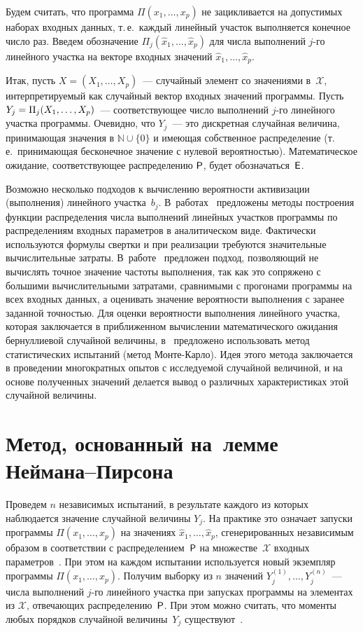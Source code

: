\begin{multicols}{2}
Будем считать, что программа $\Pi(x_1,\ldots,x_p)$ не зацикливается
на допустимых наборах входных данных, т.\,е.\ каждый линейный
участок выполняется конечное число раз. Введем обозначение
$\Pi_j(\hat x_1,\ldots,\hat x_p)$ для числа выполнений $j$-го
линейного участка на векторе входных значений $\hat x_1,\ldots,\hat
x_p$.

Итак, пусть $X=(X_1,\ldots,X_p)$~--- случайный элемент со значениями
в~$\mathcal{X}$, интерпретируемый как случайный вектор входных
значений программы. Пусть $Y_j\hm=\Pi_j(X_1,\ldots,X_p)$~---
соответствующее чис\-ло выполнений $j$-го линейного участка программы.
Очевидно, что $Y_j$~--- это дискретная случайная величина,
принимающая значения в $\mathbb{N}\cup\{0\}$ и имеющая собственное
распределение (т.\,е.\ принимающая бесконечное значение с нулевой
ве\-ро\-ят\-ностью). Математическое ожидание, соответствующее
распределению ${\sf P}$, будет обозначаться~${\sf E}$.

Возможно несколько подходов к вычислению вероятности активизации
(выполнения) линейного участка~$b_j$. В~работах~\cite{SmelyanskiAlanko1986, SmelyanskiGuryevBahmurov1986} предложены
методы построения функции распределения числа выполнений линейных
участков программы по распределениям входных параметров в
аналитическом виде. Фактически используются формулы свертки и при
реализации требуются значительные вычислительные затраты. 
В~работе~\cite{Shalimov2010} предложен подход, позволяющий не вычислять
точное значение частоты выполнения, так как это сопряжено с большими
вычислительными затратами, сравнимыми с прогонами программы на всех
входных данных, а оценивать значение вероятности выполнения с
заранее заданной точностью. Для оценки вероятности выполнения
линейного участка, которая заключается в приближенном вычислении
математического ожидания бернуллиевой случайной величины, 
в~\cite{Shalimov2010} предложено использовать метод статистических
испытаний (метод Мон\-те-Кар\-ло). Идея этого метода заключается в
проведении многократных опытов с исследуемой случайной величиной,   и
на основе полученных значений делается вывод о различных
характеристиках этой случайной величины.

\section{Метод, основанный на~лемме Неймана--Пирсона}

Проведем $n$ независимых испытаний, в результате каждого из которых
наблюдается значение случайной величины $Y_j$. На практике это
означает запуски программы $\Pi(x_1,\ldots,x_p)$ на значениях $\hat
x_1,\ldots,\hat x_p$, сгенерированных независимым образом в
соответствии с распределением~${\sf P}$ на множестве~$\mathcal{X}$
входных параметров~\cite{Shalimov2010}. При этом на каждом испытании
используется новый экземпляр программы $\Pi(x_1,\ldots,x_p)$.
Получим выборку из $n$ значений $Y_j^{(1)},\ldots,Y_j^{(n)}$~---
числа выполнений $j$-го линейного участка при запусках программы на
элементах из $\mathcal{X}$, отвечающих распределению~${\sf P}$. При
этом можно считать, что моменты любых порядков случайной величины~$Y_j$ 
существуют~\cite{Shalimov2010}.


\end{multicols}
